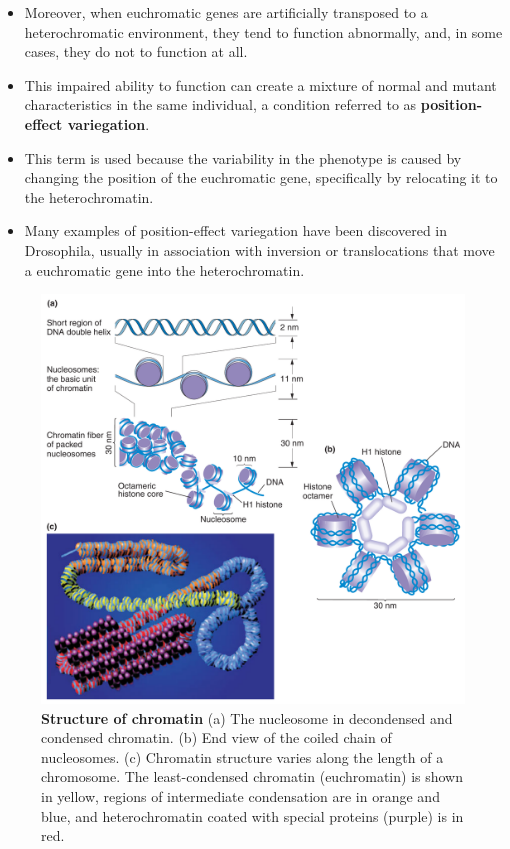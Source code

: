 \documentclass[11pt,dvipsnames,ignorenonframetext,aspectratio=169]{beamer}
\providecommand{\tightlist}{%
  \setlength{\itemsep}{0pt}\setlength{\parskip}{0pt}}
\begin{document}
\begin{frame}{}
\protect\hypertarget{section-9}{}
\begin{itemize}
\tightlist
\item
  Moreover, when euchromatic genes are artificially transposed to a
  heterochromatic environment, they tend to function abnormally, and, in
  some cases, they do not to function at all.
\item
  This impaired ability to function can create a mixture of normal and
  mutant characteristics in the same individual, a condition referred to
  as \textbf{position-effect variegation}.
\item
  This term is used because the variability in the phenotype is caused
  by changing the position of the euchromatic gene, specifically by
  relocating it to the heterochromatin.
\item
  Many examples of position-effect variegation have been discovered in
  Drosophila, usually in association with inversion or translocations
  that move a euchromatic gene into the heterochromatin.
\end{itemize}
\end{frame}

\begin{frame}{}
\protect\hypertarget{section-10}{}
\begin{figure}

{\centering \includegraphics[width=0.45\linewidth]{../images/structure_of_chromatin} 

}

\caption{\textbf{Structure of chromatin} \newline (a) The nucleosome in decondensed and condensed chromatin. (b) End view of the coiled chain of nucleosomes. (c) Chromatin structure varies along the length of a chromosome. The least-condensed chromatin (euchromatin) is shown in yellow, regions of intermediate condensation are in orange and blue, and heterochromatin coated with special proteins (purple) is in red.}\label{fig:structure-of-chromatin}
\end{figure}
\end{frame}
\end{document}
